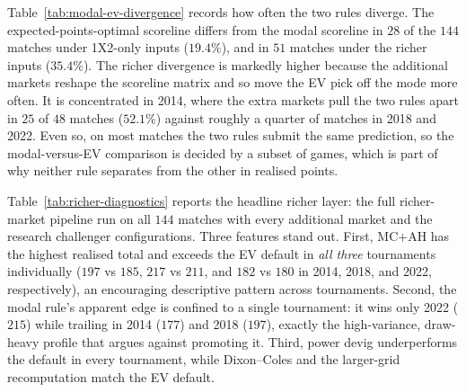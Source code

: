 \documentclass[11pt]{article}
\begin{document}
Table~\ref{tab:modal-ev-divergence} records how often the two rules diverge. The expected-points-optimal scoreline differs from the modal scoreline in $28$ of the $144$ matches under 1X2-only inputs (\(19.4\%\)), and in $51$ matches under the richer inputs (\(35.4\%\)). The richer divergence is markedly higher
because the additional markets reshape the scoreline matrix and so move the EV pick off the
mode more often. It is concentrated in 2014, where the extra markets pull the two rules apart in
$25$ of $48$ matches (\(52.1\%\)) against roughly a quarter of matches in 2018 and 2022. Even so,
on most matches the two rules submit the same prediction, so the modal-versus-EV comparison is
decided by a subset of games, which is part of why neither rule separates from the other in
realised points.

Table~\ref{tab:richer-diagnostics} reports the headline richer layer: the full richer-market pipeline run
on all $144$ matches with every additional market and the research challenger configurations.
Three features stand out. First, MC+AH has the highest
realised total and exceeds the EV default in \emph{all three} tournaments individually
($197$ vs $185$, $217$ vs $211$, and $182$ vs $180$ in 2014, 2018, and 2022, respectively), an encouraging descriptive pattern across tournaments. Second, the modal rule's apparent edge is confined to a single tournament:
it wins only 2022 ($215$) while trailing in 2014 ($177$) and 2018 ($197$), exactly the
high-variance, draw-heavy profile that argues against promoting it. Third, power devig
underperforms the default in every tournament, while Dixon--Coles and the larger-grid recomputation match the EV default.
\end{document}
